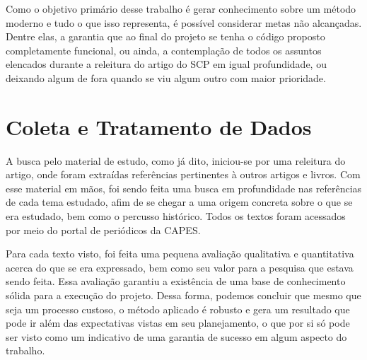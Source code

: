 Como o objetivo primário desse trabalho é gerar conhecimento sobre um método moderno e tudo o que isso representa, é possível considerar metas não alcançadas. Dentre elas, a garantia que ao final do projeto se tenha o código proposto completamente funcional, ou ainda, a contemplação de todos os assuntos elencados durante a releitura do artigo do SCP em igual profundidade, ou deixando algum de fora quando se viu algum outro com maior prioridade.

\section{Coleta e Tratamento de Dados}
\label{sec:titSecColDad}


A busca pelo material de estudo, como já dito, iniciou-se por uma releitura do artigo, onde foram extraídas referências pertinentes à outros artigos e livros. Com esse material em mãos, foi sendo feita uma busca em profundidade nas referências de cada tema estudado, afim de se chegar a uma origem concreta sobre o que se era estudado, bem como o percusso histórico. Todos os textos foram acessados por meio do portal de periódicos da CAPES.

Para cada texto visto, foi feita uma pequena avaliação qualitativa e quantitativa acerca do que se era expressado, bem como seu valor para a pesquisa que estava sendo feita. Essa avaliação garantiu a existência de uma base de conhecimento sólida para a execução do projeto. Dessa forma, podemos concluir que mesmo que seja um processo custoso, o método aplicado é robusto e gera um resultado que pode ir além das expectativas vistas em seu planejamento, o que por si só pode ser visto como um indicativo de uma garantia de sucesso em algum aspecto do trabalho.